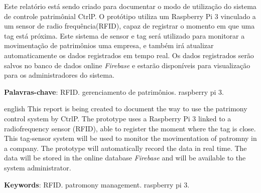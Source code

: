 \documentclass[
	12pt,				%
	openright,			%
	oneside,			%
	a4paper,			%
	english,			%
	french,				%
	spanish,			%
	brazil				%
	]{abntex2}
\begin{document}

\frenchspacing 


\imprimircapa

\imprimirfolhaderosto*


\setlength{\absparsep}{18pt} %
\begin{resumo}
Este relatório está sendo criado para documentar o modo de utilização do sistema de controle patrimônial CtrlP. O protótipo utiliza um Raspberry Pi 3 vinculado a um sensor de radio frequência(RFID), capaz de registrar o momento em que uma tag está próxima. Este sistema de sensor e tag será utilizado para monitorar a movimentação de patrimônios uma empresa, e também irá atualizar automaticamente os dados registrados em tempo real. Os dados registrados serão salvos no banco de dados online \emph{Firebase} e estarão disponíveis para visualização para os administradores do sistema.

 \textbf{Palavras-chave}: RFID. gerenciamento de patrimônios. raspberry pi 3.
\end{resumo}

\begin{resumo}[Abstract]
 \begin{otherlanguage*}{english}
This report is being created to document the way to use the patrimony control system by CtrlP. The prototype uses a Raspberry Pi 3 linked to a radiofrequency sensor (RFID), able to register the moment where the tag is close. This tag-sensor system will be used to monitor the movimentation of patromny in a company. The prototype will automatically record the data in real time. The data will be stored in the online database \emph{Firebase} and will be available to the system administrator.

   \vspace{\onelineskip}
 
   \noindent 
   \textbf{Keywords}: RFID. patromony management. raspberry pi 3.
 \end{otherlanguage*}
\end{resumo}
\end{document}
